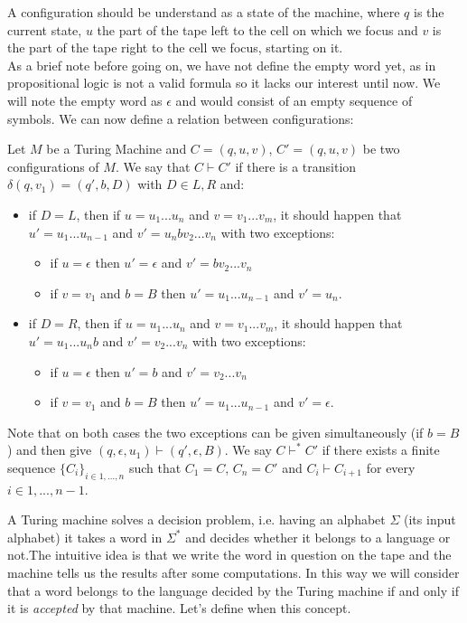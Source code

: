 A configuration should be understand as a state of the machine, where $q$ is the current state, $u$ the part of the tape left to the cell on which we focus and $v$ is the part of the tape right to the cell we focus, starting on it.\\

As a brief note before going on, we have not define the empty word yet, as in propositional logic is not a valid formula so it lacks our interest until now. We will note the empty word as $\epsilon$ and would consist of an empty sequence of symbols. We can  now define a relation between configurations:

\begin{definition}
  Let $M$ be a Turing Machine and $C=(q,u,v)$, $C'=(q,u,v)$ be two configurations of $M$. We say that $C\vdash C'$ if there is a transition $\delta (q,v_1) = (q', b, D) $ with $D\in{L,R}$ and:
  \begin{itemize}
  \item if $D=L$, then if $u=u_1...u_n$ and $v = v_1...v_m$, it should happen that $u' = u_1...u_{n-1}$ and $v' = u_n bv_2...v_n$ with two exceptions:
    \begin{itemize}
    \item if $u=\epsilon$ then $u' = \epsilon$ and $v' = bv_2...v_n$
    \item if $v = v_1$ and $b =B$ then $u'=u_1...u_{n-1}$ and $v' = u_n$.
    \end{itemize}

  \item if $D=R$, then if $u=u_1...u_n$ and $v = v_1...v_m$, it should happen that $u' = u_1...u_{n}b$ and $v' = v_2...v_n$ with two exceptions:
    \begin{itemize}
    \item if $u=\epsilon$ then $u' = b$ and $v' =v_2...v_n$
    \item if $v = v_1$ and $b =B$ then $u'=u_1...u_{n-1}$ and $v' = \epsilon$.
    \end{itemize}
  \end{itemize}

  Note that on both cases the two exceptions can be given simultaneously (if $b = B$) and then give $(q, \epsilon, u_1) \vdash (q', \epsilon, B)$. We say $C\vdash^* C'$ if there exists a finite sequence $\{C_i\}_{i\in 1,...,n}$ such that $C_1 = C$, $C_n=C'$ and $C_i\vdash C_{i+1}$ for every $i\in 1,...,n-1$.  
  \end{definition}

  A Turing machine solves a decision problem, i.e. having an alphabet $\Sigma$  (its input alphabet) it takes a word in $\Sigma^*$ and decides whether it belongs to a language or not.The intuitive idea is that we write the word in question on the tape and the machine tells us the results after some computations. In this way we will consider that a word belongs to the language decided by the Turing machine if and only if it is \emph{accepted} by that machine. Let's define when this concept.

